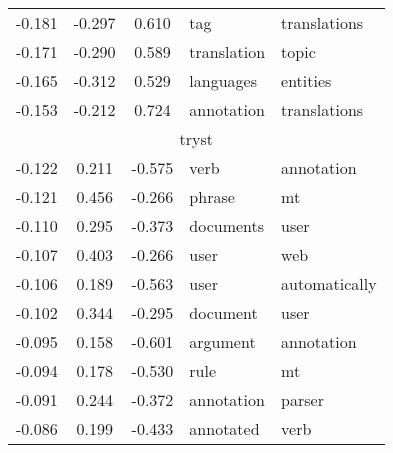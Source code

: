 \begin{tabular}{cccp{5cm}p{5cm}}
-0.181 & -0.297 & 0.610 & tag & translations \\
-0.171 & -0.290 & 0.589 & translation & topic \\
-0.165 & -0.312 & 0.529 & languages & entities \\
-0.153 & -0.212 & 0.724 & annotation & translations \\
\midrule
\multicolumn{5}{c}{tryst}\\
-0.122 & 0.211 & -0.575 & verb & annotation \\
-0.121 & 0.456 & -0.266 & phrase & mt \\
-0.110 & 0.295 & -0.373 & documents & user \\
-0.107 & 0.403 & -0.266 & user & web \\
-0.106 & 0.189 & -0.563 & user & automatically \\
-0.102 & 0.344 & -0.295 & document & user \\
-0.095 & 0.158 & -0.601 & argument & annotation \\
-0.094 & 0.178 & -0.530 & rule & mt \\
-0.091 & 0.244 & -0.372 & annotation & parser \\
-0.086 & 0.199 & -0.433 & annotated & verb \\
\bottomrule
\end{tabular}

